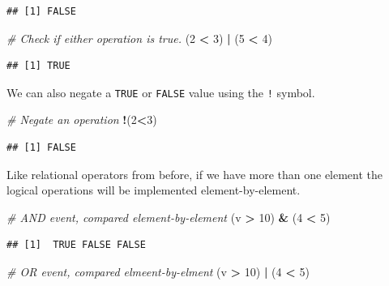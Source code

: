 \documentclass[
]{book}
\newenvironment{Shaded}{\begin{snugshade}}{\end{snugshade}}
\newcommand{\CommentTok}[1]{\textcolor[rgb]{0.56,0.35,0.01}{\textit{#1}}}
\newcommand{\DecValTok}[1]{\textcolor[rgb]{0.00,0.00,0.81}{#1}}
\newcommand{\NormalTok}[1]{#1}
\newcommand{\OperatorTok}[1]{\textcolor[rgb]{0.81,0.36,0.00}{\textbf{#1}}}
\newcommand{\StringTok}[1]{\textcolor[rgb]{0.31,0.60,0.02}{#1}}
\begin{document}
\begin{verbatim}
## [1] FALSE
\end{verbatim}

\begin{Shaded}
\begin{Highlighting}[]
\CommentTok{# Check if either operation is true. }
\NormalTok{(}\DecValTok{2} \OperatorTok{<}\StringTok{ }\DecValTok{3}\NormalTok{) }\OperatorTok{|}\StringTok{ }\NormalTok{(}\DecValTok{5} \OperatorTok{<}\StringTok{ }\DecValTok{4}\NormalTok{)}
\end{Highlighting}
\end{Shaded}

\begin{verbatim}
## [1] TRUE
\end{verbatim}

We can also negate a \texttt{TRUE} or \texttt{FALSE} value using the \texttt{!} symbol.

\begin{Shaded}
\begin{Highlighting}[]
\CommentTok{# Negate an operation }
\OperatorTok{!}\NormalTok{(}\DecValTok{2}\OperatorTok{<}\DecValTok{3}\NormalTok{) }
\end{Highlighting}
\end{Shaded}

\begin{verbatim}
## [1] FALSE
\end{verbatim}

Like relational operators from before, if we have more than one element the logical operations will be implemented element-by-element.

\begin{Shaded}
\begin{Highlighting}[]
\CommentTok{# AND event, compared element-by-element}
\NormalTok{(v }\OperatorTok{>}\StringTok{ }\DecValTok{10}\NormalTok{) }\OperatorTok{&}\StringTok{ }\NormalTok{(}\DecValTok{4} \OperatorTok{<}\StringTok{ }\DecValTok{5}\NormalTok{) }
\end{Highlighting}
\end{Shaded}

\begin{verbatim}
## [1]  TRUE FALSE FALSE
\end{verbatim}

\begin{Shaded}
\begin{Highlighting}[]
\CommentTok{# OR event, compared elmeent-by-elment}
\NormalTok{(v }\OperatorTok{>}\StringTok{ }\DecValTok{10}\NormalTok{) }\OperatorTok{|}\StringTok{ }\NormalTok{(}\DecValTok{4} \OperatorTok{<}\StringTok{ }\DecValTok{5}\NormalTok{) }
\end{Highlighting}
\end{Shaded}
\end{document}
